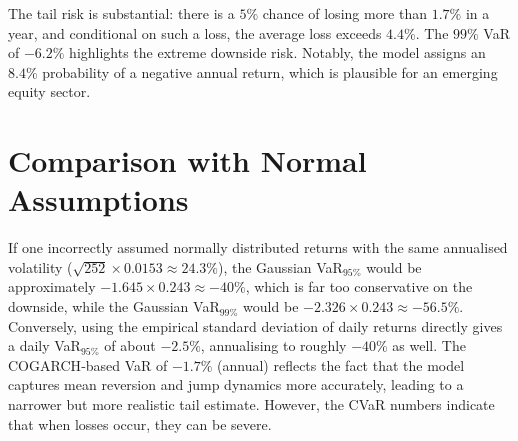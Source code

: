 The tail risk is substantial: there is a $5\%$ chance of losing more than $1.7\%$ in a year, and conditional on such a loss, the average loss exceeds $4.4\%$. The $99\%$ VaR of $-6.2\%$ highlights the extreme downside risk. Notably, the model assigns an $8.4\%$ probability of a negative annual return, which is plausible for an emerging equity sector.

\section{Comparison with Normal Assumptions}
If one incorrectly assumed normally distributed returns with the same annualised volatility ($\sqrt{252}\times 0.0153 \approx 24.3\%$), the Gaussian VaR$_{95\%}$ would be approximately $-1.645\times 0.243 \approx -40\%$, which is far too conservative on the downside, while the Gaussian VaR$_{99\%}$ would be $-2.326\times 0.243 \approx -56.5\%$. Conversely, using the empirical standard deviation of daily returns directly gives a daily VaR$_{95\%}$ of about $-2.5\%$, annualising to roughly $-40\%$ as well. The COGARCH‑based VaR of $-1.7\%$ (annual) reflects the fact that the model captures mean reversion and jump dynamics more accurately, leading to a narrower but more realistic tail estimate. However, the CVaR numbers indicate that when losses occur, they can be severe.
